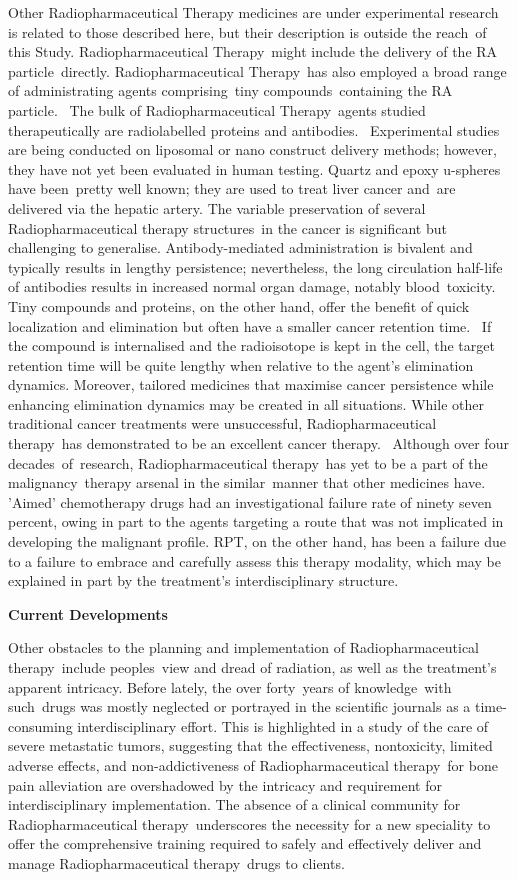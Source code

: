 \documentclass[
]{article}
\begin{document}
Other Radiopharmaceutical Therapy medicines are under experimental
research is related to those described here, but their description is
outside the reach~of this Study. Radiopharmaceutical Therapy~might
include the delivery of the RA particle~directly. Radiopharmaceutical
Therapy~has also employed a broad range of administrating agents
comprising~tiny compounds~containing the RA particle.~ The bulk of
Radiopharmaceutical Therapy~agents studied therapeutically are
radiolabelled proteins and antibodies.~ Experimental studies are being
conducted on liposomal or nano construct delivery methods; however, they
have not yet been evaluated in human testing. Quartz and epoxy u-spheres
have been~pretty well known; they are used to treat liver cancer and~are
delivered via the hepatic artery. The variable preservation of several
Radiopharmaceutical therapy structures~in the cancer is significant but
challenging to generalise. Antibody-mediated administration is bivalent
and typically results in lengthy persistence; nevertheless, the long
circulation half-life of antibodies results in increased normal organ
damage, notably blood~toxicity. Tiny compounds and proteins, on the
other hand, offer the benefit of quick localization and elimination but
often have a smaller cancer retention time.~ If the compound is
internalised and the radioisotope is kept in the cell, the target
retention time will be quite lengthy when relative to the agent's
elimination dynamics. Moreover, tailored medicines that maximise cancer
persistence while enhancing elimination dynamics may be created in all
situations. While other traditional cancer treatments were unsuccessful,
Radiopharmaceutical therapy~has demonstrated to be an excellent cancer
therapy.~ Although over four decades~of~research, Radiopharmaceutical
therapy~has yet to be a part of the malignancy~therapy arsenal in the
similar~manner that other medicines have.~ 'Aimed' chemotherapy drugs
had an investigational failure rate of ninety seven percent, owing in
part to the agents targeting a route that was not implicated in
developing the malignant profile. RPT, on the other hand, has been a
failure due to a failure to embrace and carefully assess this therapy
modality, which may be explained in part by the treatment's
interdisciplinary structure.

\textbf{Current Developments}

Other obstacles to the planning and implementation of
Radiopharmaceutical therapy~include peoples~view and dread of radiation,
as well as the treatment's apparent intricacy. Before lately, the over
forty~years of knowledge~with such~drugs was mostly neglected or
portrayed in the scientific journals as a time-consuming
interdisciplinary effort. This is highlighted in a study of the care of
severe metastatic tumors, suggesting that the effectiveness,
nontoxicity, limited adverse effects, and non-addictiveness of
Radiopharmaceutical therapy~for bone pain alleviation are overshadowed
by the intricacy and requirement for interdisciplinary implementation.
The absence of a clinical community for Radiopharmaceutical
therapy~underscores the necessity for a new speciality to offer the
comprehensive training required to safely and effectively deliver and
manage Radiopharmaceutical therapy~drugs to clients.
\end{document}
